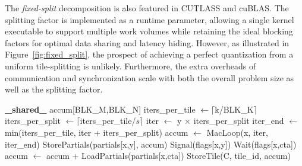 The \emph{fixed-split} decomposition is also featured in CUTLASS and cuBLAS. The splitting factor is implemented as a runtime parameter, allowing a single kernel executable to support multiple work volumes while retaining the ideal blocking factors for optimal data sharing and latency hiding. However, as illustrated in 
Figure~\ref{fig:fixed_split}, the prospect of achieving a perfect quantization from a uniform tile-splitting is unlikely.  Furthermore, the extra overheads of communication and synchronization scale with both the overall problem size as well as the splitting factor.

\begin{algorithm}[!htp]

    \footnotesize
    \caption{\textit{Fixed-split} GPU GEMM with splitting factor $s$.}\label{alg:fixed_split}
    \begin{algorithmic}[1]
    \State \textbf{\_shared\_}  accum[BLK\_M,BLK\_N]
    \State iters\_per\_tile $\gets \lceil$k/BLK\_K$\rceil$
    \State iters\_per\_split $\gets \lceil$iters\_per\_tile/$s$$\rceil$
        \State iter $\gets$ y $\times$ iters\_per\_split
        \State iter\_end $\gets$ min(iters\_per\_tile, iter + iters\_per\_split)
        \State accum $\gets$ MacLoop(x, iter, iter\_end)
            \State StorePartials(partials[x,y], accum) \State Signal(flags[x,y])
        \Else
                \State Wait(flags[x,cta])
                \State accum $\gets$ accum + LoadPartials(partials[x,cta])
            \EndFor
            \State StoreTile(C, tile\_id, accum) \EndIf \EndFork
    \end{algorithmic}
\end{algorithm}

